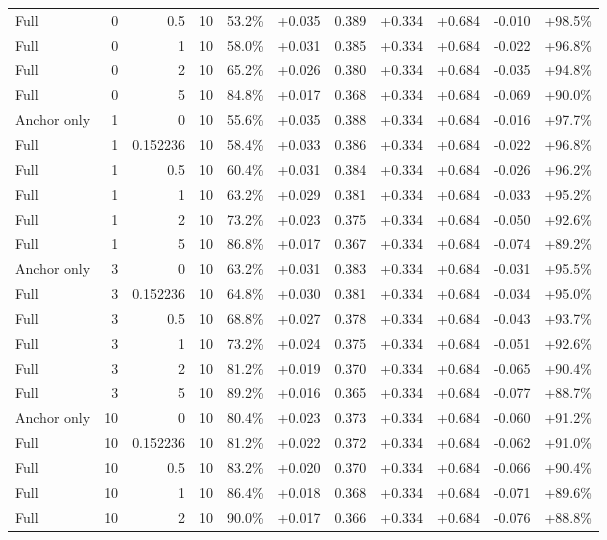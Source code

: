 \begin{table}[htbp]
\begin{tabular}{lrrrccccccc}
Full & 0 & 0.5 & 10 & 53.2\% & +0.035 & 0.389 & +0.334 & +0.684 & -0.010 & +98.5\% \\
Full & 0 & 1 & 10 & 58.0\% & +0.031 & 0.385 & +0.334 & +0.684 & -0.022 & +96.8\% \\
Full & 0 & 2 & 10 & 65.2\% & +0.026 & 0.380 & +0.334 & +0.684 & -0.035 & +94.8\% \\
Full & 0 & 5 & 10 & 84.8\% & +0.017 & 0.368 & +0.334 & +0.684 & -0.069 & +90.0\% \\
Anchor only & 1 & 0 & 10 & 55.6\% & +0.035 & 0.388 & +0.334 & +0.684 & -0.016 & +97.7\% \\
Full & 1 & 0.152236 & 10 & 58.4\% & +0.033 & 0.386 & +0.334 & +0.684 & -0.022 & +96.8\% \\
Full & 1 & 0.5 & 10 & 60.4\% & +0.031 & 0.384 & +0.334 & +0.684 & -0.026 & +96.2\% \\
Full & 1 & 1 & 10 & 63.2\% & +0.029 & 0.381 & +0.334 & +0.684 & -0.033 & +95.2\% \\
Full & 1 & 2 & 10 & 73.2\% & +0.023 & 0.375 & +0.334 & +0.684 & -0.050 & +92.6\% \\
Full & 1 & 5 & 10 & 86.8\% & +0.017 & 0.367 & +0.334 & +0.684 & -0.074 & +89.2\% \\
Anchor only & 3 & 0 & 10 & 63.2\% & +0.031 & 0.383 & +0.334 & +0.684 & -0.031 & +95.5\% \\
Full & 3 & 0.152236 & 10 & 64.8\% & +0.030 & 0.381 & +0.334 & +0.684 & -0.034 & +95.0\% \\
Full & 3 & 0.5 & 10 & 68.8\% & +0.027 & 0.378 & +0.334 & +0.684 & -0.043 & +93.7\% \\
Full & 3 & 1 & 10 & 73.2\% & +0.024 & 0.375 & +0.334 & +0.684 & -0.051 & +92.6\% \\
Full & 3 & 2 & 10 & 81.2\% & +0.019 & 0.370 & +0.334 & +0.684 & -0.065 & +90.4\% \\
Full & 3 & 5 & 10 & 89.2\% & +0.016 & 0.365 & +0.334 & +0.684 & -0.077 & +88.7\% \\
Anchor only & 10 & 0 & 10 & 80.4\% & +0.023 & 0.373 & +0.334 & +0.684 & -0.060 & +91.2\% \\
Full & 10 & 0.152236 & 10 & 81.2\% & +0.022 & 0.372 & +0.334 & +0.684 & -0.062 & +91.0\% \\
Full & 10 & 0.5 & 10 & 83.2\% & +0.020 & 0.370 & +0.334 & +0.684 & -0.066 & +90.4\% \\
Full & 10 & 1 & 10 & 86.4\% & +0.018 & 0.368 & +0.334 & +0.684 & -0.071 & +89.6\% \\
Full & 10 & 2 & 10 & 90.0\% & +0.017 & 0.366 & +0.334 & +0.684 & -0.076 & +88.8\% \\

\end{tabular}
\end{table}
